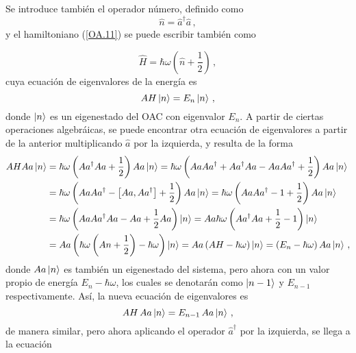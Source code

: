 Se introduce también el operador número, definido como
\begin{equation}
  \label{OA.12}
  \hat{n} = \hat{a}^{\dagger} \hat{a}\,,
\end{equation}
y el hamiltoniano (\ref{OA.11}) se puede escribir también como

\begin{equation}
  \label{OA.13}
  \hat{H} = \hbar \omega \left(\hat{n} + \frac{1}{2}\right)\,,
\end{equation}
cuya ecuación de eigenvalores de la energía es
\begin{equation}
  \label{OA.14}
  A{H} \ket{n} = E_n\ket{n} \,,
\end{equation}
donde $\ket{n}$ es un eigenestado del OAC con eigenvalor $E_n$. A partir de ciertas operaciones algebráicas, se puede encontrar otra ecuación de eigenvalores a partir de la anterior multiplicando $\hat{a}$ por la izquierda, y resulta de la forma
\begin{align*}
  A{H} A{a}\ket{n} & = \hbar\omega\left(A{a}^{\dagger}A{a}+\frac{1}{2}\right)A{a}\ket{n} = \hbar\omega\left(A{a}A{a}^{\dagger}+A{a}^{\dagger}A{a}-A{a}A{a}^{\dagger}+\frac{1}{2}\right)A{a}\ket{n} \\
                         & = \hbar\omega\left(A{a}A{a}^{\dagger}-\left[A{a},A{a}^{\dagger}\right]+\frac{1}{2}\right)A{a}\ket{n} = \hbar\omega\left(A{a}A{a}^{\dagger}-1+\frac{1}{2}\right)A{a}\ket{n}          \\
                         & = \hbar\omega\left(A{a}A{a}^{\dagger}A{a}-A{a}+\frac{1}{2}A{a}\right)\ket{n} = A{a}\hbar\omega\left(A{a}^{\dagger}A{a}+\frac{1}{2}-1\right)\ket{n}                                  \\
                         & = A{a}\left(\hbar\omega\left(A{n}+\frac{1}{2}\right)-\hbar\omega\right)\ket{n} = A{a}\left(A{H}-\hbar\omega\right)\ket{n} = \left(E_{n}-\hbar\omega\right)A{a}\ket{n}\,,
\end{align*}
donde $A{a}\ket{n}$ es también un eigenestado del sistema, pero ahora con un valor propio de energía $E_n - \hbar\omega$, los cuales se denotarán como $\ket{n-1}$ y $E_{n-1}$ respectivamente. Así, la nueva ecuación de eigenvalores es
\begin{equation}
  \label{OA.15}
  A{H}\, A{a}\ket{n} = E_{n-1}\, A{a}\ket{n}\,,
\end{equation} %
de manera similar, pero ahora aplicando el operador $\hat{a}^{\dagger}$ por la izquierda, se llega a la ecuación
